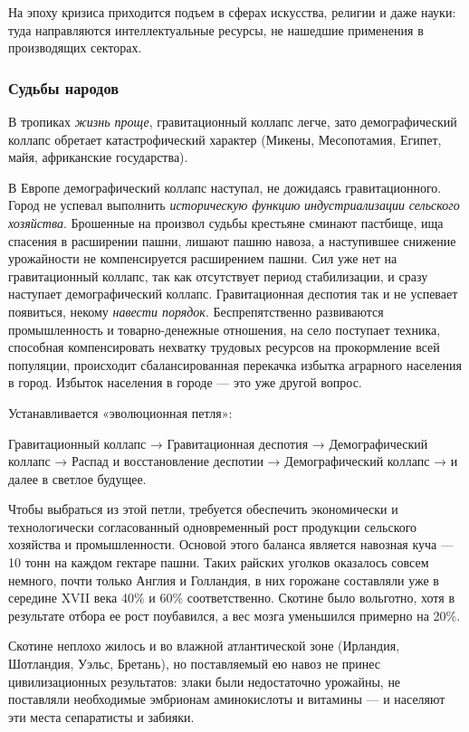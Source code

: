На эпоху кризиса приходится подъем в сферах искусства, религии и даже науки: туда направляются интеллектуальные ресурсы,
не нашедшие применения в производящих секторах.

\subsubsection[Судьбы народов]{Судьбы народов}

В тропиках \textit{жизнь проще}, гравитационный коллапс легче, зато демографический коллапс обретает катастрофический
характер (Микены, Месопотамия, Египет, майя, африканские государства).


В Европе демографический коллапс наступал, не дожидаясь гравитационного. Город не успевал выполнить \textit{историческую
функцию} \textit{индустриализации} \textit{сельского хозяйства}. Брошенные на произвол судьбы крестьяне сминают
пастбище, ища спасения в расширении пашни, лишают пашню навоза, а наступившее снижение урожайности не компенсируется
расширением пашни. Сил уже нет на гравитационный коллапс, так как отсутствует период стабилизации, и сразу наступает
демографический коллапс. Гравитационная деспотия так и не успевает появиться, некому \textit{навести порядок}.
Беспрепятственно развиваются промышленность и товарно-денежные отношения, на село поступает техника, способная
компенсировать нехватку трудовых ресурсов на прокормление всей популяции, происходит сбалансированная перекачка избытка
аграрного населения в город. Избыток населения в городе — это уже другой вопрос.


Устанавливается «эволюционная петля»:


Гравитационный коллапс → Гравитационная деспотия → Демографический коллапс → Распад и восстановление деспотии →
Демографический коллапс → и далее в светлое будущее.


Чтобы выбраться из этой петли, требуется обеспечить экономически и технологически согласованный одновременный рост
продукции сельского хозяйства и промышленности. Основой этого баланса является навозная куча — 10 тонн на каждом
гектаре пашни. Таких райских уголков оказалось совсем немного, почти только Англия и Голландия, в них горожане
составляли уже в середине \foreignlanguage{english}{XVII} века 40\% и 60\% соответственно. Скотине было вольготно, хотя
в результате отбора ее рост поубавился, а вес мозга уменьшился примерно на 20\%.


Скотине неплохо жилось и во влажной атлантической зоне (Ирландия, Шотландия, Уэльс, Бретань), но поставляемый ею навоз
не принес цивилизационных результатов: злаки были недостаточно урожайны, не поставляли необходимые эмбрионам
аминокислоты и витамины — и населяют эти места сепаратисты и забияки.

